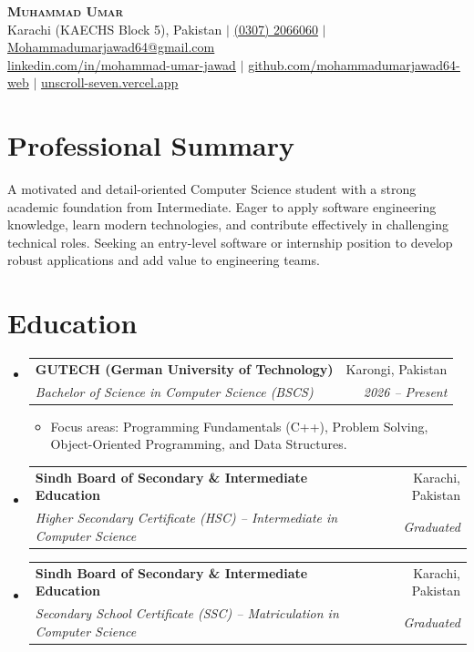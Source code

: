 \documentclass[letterpaper,11pt]{article}
\makeatletter
\newcommand{\resumeItem}[1]{
  \item\small{
    {#1 \vspace{-2pt}}
  }
}
\newcommand{\resumeSubheading}[4]{
  \vspace{-2pt}\item
    \begin{tabular*}{0.97\textwidth}[t]{l@{\extracolsep{\fill}}r}
      \textbf{#1} & #2 \\
      \textit{\small#3} & \textit{\small #4} \\
    \end{tabular*}\vspace{-7pt}
}
\newcommand{\resumeSubHeadingListStart}{\begin{itemize}[leftmargin=0.15in, label={}]}
\newcommand{\resumeSubHeadingListEnd}{\end{itemize}}
\newcommand{\resumeItemListStart}{\begin{itemize}}
\newcommand{\resumeItemListEnd}{\end{itemize}\vspace{-5pt}}
\makeatother
\begin{document}
\begin{center}
    \textbf{\Huge \scshape Muhammad Umar} \\ \vspace{4pt}
    \small Karachi (KAECHS Block 5), Pakistan $|$ \href{tel:03072066060}{(0307) 2066060} $|$ 
    \href{mailto:Mohammadumarjawad64@gmail.com}{\underline{Mohammadumarjawad64@gmail.com}} \\ \vspace{2pt}
    \href{https://linkedin.com/in/mohammad-umar-jawad-b80508253/}{\underline{linkedin.com/in/mohammad-umar-jawad}} $|$
    \href{https://github.com/mohammadumarjawad64-web}{\underline{github.com/mohammadumarjawad64-web}} $|$
    \href{https://unscroll-seven.vercel.app/}{\underline{unscroll-seven.vercel.app}}
\end{center}

\section{Professional Summary}
\small{
  A motivated and detail-oriented Computer Science student with a strong academic foundation from Intermediate. Eager to apply software engineering knowledge, learn modern technologies, and contribute effectively in challenging technical roles. Seeking an entry-level software or internship position to develop robust applications and add value to engineering teams.
}

\section{Education}
  \resumeSubHeadingListStart
    \resumeSubheading
      {GUTECH (German University of Technology)}{Karongi, Pakistan}
      {Bachelor of Science in Computer Science (BSCS)}{2026 -- Present}
      \resumeItemListStart
        \resumeItem{Focus areas: Programming Fundamentals (C++), Problem Solving, Object-Oriented Programming, and Data Structures.}
      \resumeItemListEnd
    \resumeSubheading
      {Sindh Board of Secondary \& Intermediate Education}{Karachi, Pakistan}
      {Higher Secondary Certificate (HSC) -- Intermediate in Computer Science}{Graduated}
    \resumeSubheading
      {Sindh Board of Secondary \& Intermediate Education}{Karachi, Pakistan}
      {Secondary School Certificate (SSC) -- Matriculation in Computer Science}{Graduated}
  \resumeSubHeadingListEnd

\end{document}
